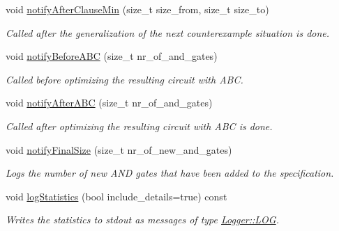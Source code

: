 \begin{DoxyCompactItemize}
void \hyperlink{classLearningExtractorStatistics_afb94f9819de27d6110eebae020461c13}{notify\-After\-Clause\-Min} (size\-\_\-t size\-\_\-from, size\-\_\-t size\-\_\-to)
\begin{DoxyCompactList}\small\item\em Called after the generalization of the next counterexample situation is done. \end{DoxyCompactList}\item 
void \hyperlink{classLearningExtractorStatistics_ab8c8b1c3832a79f055d45dca58e71725}{notify\-Before\-A\-B\-C} (size\-\_\-t nr\-\_\-of\-\_\-and\-\_\-gates)
\begin{DoxyCompactList}\small\item\em Called before optimizing the resulting circuit with A\-B\-C. \end{DoxyCompactList}\item 
void \hyperlink{classLearningExtractorStatistics_a5e81951534c5a246f31fc4214b6c138c}{notify\-After\-A\-B\-C} (size\-\_\-t nr\-\_\-of\-\_\-and\-\_\-gates)
\begin{DoxyCompactList}\small\item\em Called after optimizing the resulting circuit with A\-B\-C is done. \end{DoxyCompactList}\item 
void \hyperlink{classLearningExtractorStatistics_af537e9d8d93bec157dddda73cd05a891}{notify\-Final\-Size} (size\-\_\-t nr\-\_\-of\-\_\-new\-\_\-and\-\_\-gates)
\begin{DoxyCompactList}\small\item\em Logs the number of new A\-N\-D gates that have been added to the specification. \end{DoxyCompactList}\item 
void \hyperlink{classLearningExtractorStatistics_a1938df334b6ec4b80f2d7240a6a6fa49}{log\-Statistics} (bool include\-\_\-details=true) const 
\begin{DoxyCompactList}\small\item\em Writes the statistics to stdout as messages of type \hyperlink{classLogger_ac9e601f90bf326ce2088de52018861dca07be7495a7931bee16f5d94b3671f5de}{Logger\-::\-L\-O\-G}. \end{DoxyCompactList}\end{DoxyCompactItemize}
